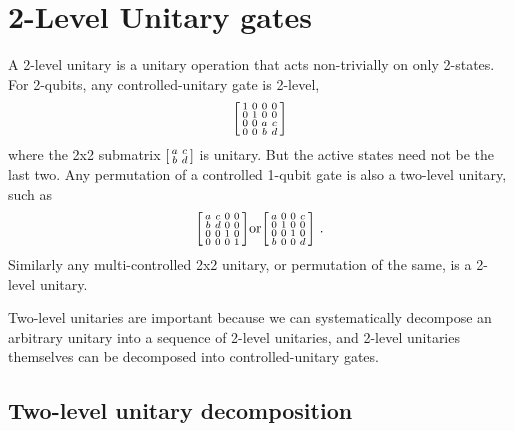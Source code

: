 
\clearpage

\section{2-Level Unitary gates}

A 2-level unitary is a unitary operation that acts non-trivially on only 2-states. For 2-qubits, any controlled-unitary gate is 2-level,
\[
\begin{bsmallmatrix}
    1 & 0 & 0 & 0 \\ 
    0 & 1 & 0 & 0 \\ 
    0 & 0 & a & c \\ 
    0 & 0 & b & d        
\end{bsmallmatrix}
\]
where the 2x2 submatrix $\begin{bsmallmatrix}
    a & c \\ 
    b & d        
\end{bsmallmatrix}$ 
is unitary. But the active states need not be the last two. Any permutation of a controlled 1-qubit gate is also a two-level unitary, such as 
\[
\begin{bsmallmatrix}
    a & c & 0 & 0 \\ 
    b & d & 0 & 0 \\ 
    0 & 0 & 1 & 0 \\ 
    0 & 0 & 0 & 1        
\end{bsmallmatrix}
\text{or}
\begin{bsmallmatrix}
    a & 0 & 0 & c \\ 
    0 & 1 & 0 & 0 \\ 
    0 & 0 & 1 & 0 \\ 
    b & 0 & 0 & d        
\end{bsmallmatrix} \ .
\]
Similarly any multi-controlled 2x2 unitary, or permutation of the same, is a 2-level unitary. 

Two-level unitaries are important because we can systematically decompose an arbitrary unitary into a sequence of 2-level unitaries, and 2-level unitaries themselves can be decomposed into controlled-unitary gates. 


\subsection{Two-level unitary decomposition}

